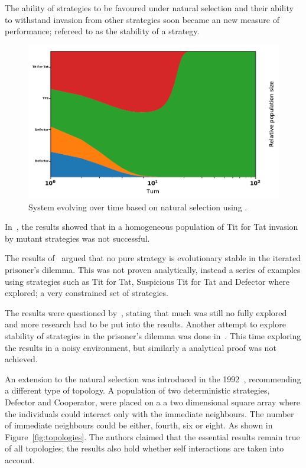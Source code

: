 \documentclass{article}
\begin{document}
The ability of strategies to be favoured under natural selection and their 
ability to withstand invasion from other strategies soon became an new measure 
of performance; refereed to as the stability of a strategy.

\begin{figure}[!hbtp]
    \centering
    \includegraphics[width=.6\textwidth]{./assets/images/ecological.pdf}
    \caption{System evolving over time based on natural selection using
    \cite{axelrodproject}.}
    \label{fig:ecological.tournament}
\end{figure}

In~\cite{Axelrod1981}, the results showed that in a homogeneous
population of Tit for Tat invasion by mutant strategies was not successful.

The results of~\cite{Boyd1987} argued that no pure strategy is evolutionary
stable in the iterated prisoner's dilemma. This was not proven analytically, instead
a series of examples using strategies such as Tit for Tat, Suspicious
Tit for Tat and Defector where explored; a very constrained set of strategies.

The results were questioned by~\cite{May1987}, stating that much was
still no fully explored and more research had to be put into the results.
Another attempt to explore stability of strategies in the prisoner's dilemma
was done in~\cite{Boyd1989}. This time exploring the results in a noisy
environment, but similarly a analytical proof was not achieved.

An extension to the natural selection was introduced in the 1992~\cite{Nowak1992},
recommending a different type of topology. A population of two deterministic
strategies, Defector and Cooperator, were placed on a a two dimensional square array
where the individuals could interact only with the immediate neighbours.
The number of immediate neighbours could be either, fourth, six or eight. As
shown in Figure~\ref{fig:topologies}. The authors claimed that the essential
results remain true of all topologies; the results also hold whether self interactions
are taken into account.
\end{document}
